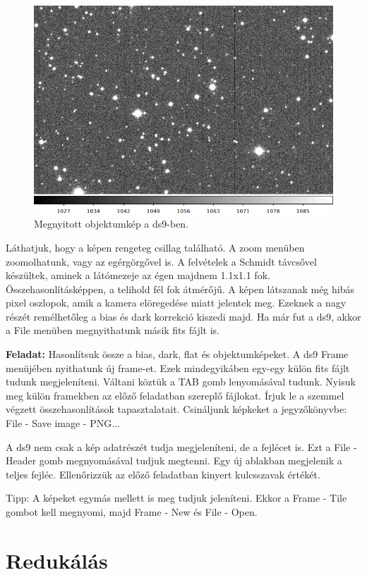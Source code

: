 \documentclass{article}
\begin{document}
\begin{figure}
    \centering
    \includegraphics[width=0.8\linewidth]{pics/object.png}
    \caption{Megnyitott objektumkép a ds9-ben.}
    \label{objds9}
\end{figure}

Láthatjuk, hogy a képen rengeteg csillag található. A zoom menüben zoomolhatunk,
vagy az egérgörgővel is. A felvételek a Schmidt távcsővel készültek, aminek a
látómezeje az égen majdnem 1.1x1.1 fok. Összehasonlításképpen, a telihold fél
fok átmérőjű.
A képen látszanak még hibás pixel oszlopok, amik a kamera elöregedése miatt
jelentek meg. Ezeknek a nagy részét remélhetőleg a bias és dark korrekció
kiszedi majd.
Ha már fut a ds9, akkor a File menüben megnyithatunk másik fits fájlt is.

{\bf Feladat:}
Hasonlítsuk össze a bias, dark, flat és objektumképeket.
A ds9 Frame menüjében nyithatunk új frame-et. Ezek mindegyikáben egy-egy külön
fits fájlt tudunk megjeleníteni. Váltani köztük a TAB gomb lenyomásával tudunk.
Nyisuk meg külön framekben az előző feladatban szereplő fájlokat. Írjuk le a
szemmel végzett összehasonlítások tapasztalatait. Csináljunk képkeket a
jegyzőkönyvbe:
File - Save image - PNG...

A ds9 nem csak a kép adatrészét tudja megjeleníteni, de a fejlécet is. Ezt a
File - Header gomb megnyomásával tudjuk megtenni. Egy új ablakban megjelenik a
teljes fejléc. Ellenőrizzük az előző feladatban kinyert kulcsszavak értékét.

Tipp: A képeket egymás mellett is meg tudjuk jeleníteni. Ekkor a Frame - Tile
gombot kell megnyomi, majd Frame - New és File - Open.

\section{Redukálás}
\end{document}
